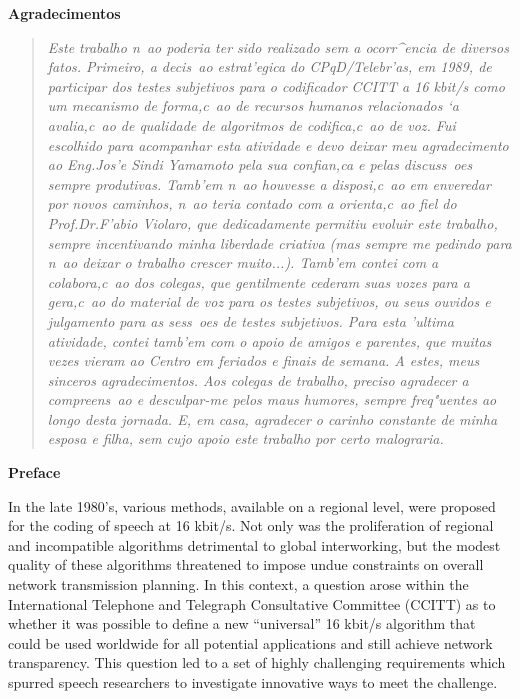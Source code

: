 \newpage
\thispagestyle{empty}

\begin{center}
		\bf Agradecimentos
\end{center}


\begin{quote}
\em
	Este trabalho n~ao poderia ter sido realizado sem a ocorr^encia
	de diversos fatos. Primeiro, a decis~ao estrat'egica do
	CPqD/Telebr'as, em 1989, de participar dos testes subjetivos
	para o codificador CCITT a 16 kbit/s como um mecanismo de
	forma,c~ao de recursos humanos relacionados `a avalia,c~ao de
	qualidade de algoritmos de codifica,c~ao de voz. Fui escolhido
	para acompanhar esta atividade e devo deixar meu agradecimento
	ao Eng.Jos'e Sindi Yamamoto pela sua confian,ca e pelas
	discuss~oes sempre produtivas. Tamb'em n~ao houvesse a
	disposi,c~ao em enveredar por novos caminhos, n~ao teria
	contado com a orienta,c~ao fiel do Prof.Dr.F'abio Violaro, que
	dedicadamente permitiu evoluir este trabalho, sempre
	incentivando minha liberdade criativa (mas sempre me pedindo
	para n~ao deixar o trabalho crescer muito...).  Tamb'em contei
	com a colabora,c~ao dos colegas, que gentilmente cederam suas
	vozes para a gera,c~ao do material de voz para os testes
	subjetivos, ou seus ouvidos e julgamento para as sess~oes de
	testes subjetivos. Para esta 'ultima atividade, contei tamb'em
	com o apoio de amigos e parentes, que muitas vezes vieram ao
	Centro em feriados e finais de semana. A estes, meus sinceros
	agradecimentos. Aos colegas de trabalho, preciso agradecer a
	compreens~ao e desculpar-me pelos maus humores, sempre
	freq"uentes ao longo desta jornada. E, em casa, agradecer o
	carinho constante de minha esposa e filha, sem cujo apoio este
	trabalho por certo malograria.
\end{quote}


\newpage
\thispagestyle{plain}
\setcounter{page}{1}

\begin{center}
	\LARGE\bf Preface
\end{center}


In the late 1980's, various methods, available on a regional level,
were proposed for the coding of speech at 16 kbit/s. Not only was the
proliferation of regional and incompatible algorithms detrimental to
global interworking, but the modest quality of these algorithms
threatened to impose undue constraints on overall network transmission
planning. In this context, a question arose within the International
Telephone and Telegraph Consultative Committee (CCITT) as to whether it
was possible to define a new ``universal'' 16 kbit/s algorithm that
could be used worldwide for all potential applications and still
achieve network transparency. This question led to a set of highly
challenging requirements which spurred speech researchers to
investigate innovative ways to meet the challenge.


